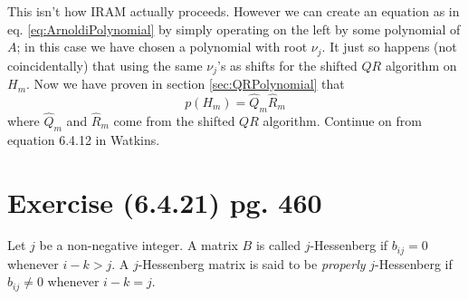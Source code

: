 \documentclass[10pt,letterpaper]{article}
\newcommand{\QR}{\ensuremath{QR} }
\begin{document}
This isn't how IRAM actually proceeds.  However we can create an equation as in eq. \ref{eq:ArnoldiPolynomial} by simply operating on the left by some polynomial of $A$; in this case we have chosen a polynomial with root $\nu_j$.  It just so happens (not coincidentally) that using the same $\nu_j$'s as shifts for the shifted \QR algorithm on $H_m$.  Now we have proven in section \ref{sec:QRPolynomial} that 
\begin{equation}
    p\left(H_m\right) = \hat{Q}_m\hat{R}_m
\end{equation}
where $\hat{Q}_m$ and $\hat{R}_m$ come from the shifted \QR algorithm.  Continue on from equation 6.4.12 in Watkins.

\section{Exercise (6.4.21) pg. 460}
Let $j$ be a non-negative integer.  A matrix $B$ is called $j$-Hessenberg if $b_{ij} = 0$ whenever $i-k>j$.  A $j$-Hessenberg matrix is said to be \emph{properly} $j$-Hessenberg if $b_{ij} \neq 0$ whenever $i-k=j$.
\end{document}
